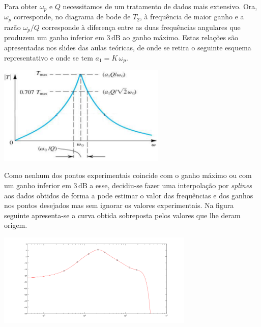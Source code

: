 \documentclass[a4paper,11pt]{report}
\begin{document}
Para obter $\omega_p$ e $Q$ necessitamos de um tratamento de dados mais extensivo. Ora, $\omega_p$ corresponde, no diagrama de bode de $T_2$, à frequência de maior ganho e a razão $\omega_p/Q$ corresponde à diferença entre as duas frequências angulares que produzem um ganho inferior em $3\,\textrm{dB}$ ao ganho máximo. Estas relações são apresentadas nos slides das aulas teóricas, de onde se retira o seguinte esquema representativo e onde se tem $a_1=K\,\omega_p$.

     \begin{center}
     \includegraphics[angle=0,width=0.6\textwidth]{passabanda.png}
     \label{fig:passabanda}
     \end{center}

Como nenhum dos pontos experimentais coincide com o ganho máximo ou com um ganho inferior em $3\,\textrm{dB}$ a esse, decidiu-se fazer uma interpolação por \textit{splines} aos dados obtidos de forma a pode estimar o valor das frequências e dos ganhos nos pontos desejados mas sem ignorar os valores experimentais. Na figura seguinte apresenta-se a curva obtida sobreposta pelos valores que lhe deram origem.

     \begin{center}
     \includegraphics[angle=0,width=0.7\textwidth]{fitbanda.png}
     \label{fig:fitbanda}
     \end{center}
\end{document}
